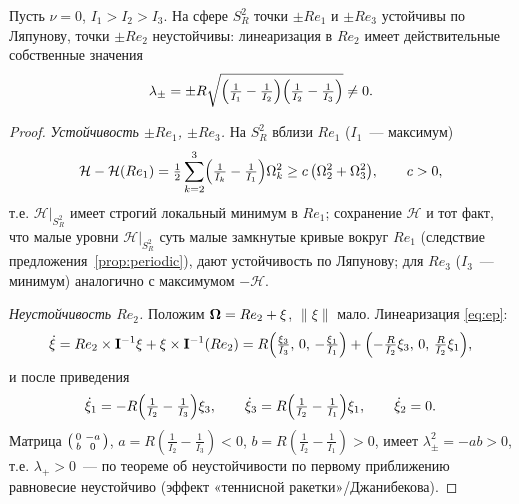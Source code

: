 \begin{proposition}\label{prop:stability}
Пусть $\nu = 0$, $I_1 > I_2 > I_3$. На сфере $S^2_R$ точки $\pm Re_1$
и $\pm Re_3$ устойчивы по Ляпунову, точки $\pm Re_2$ неустойчивы:
линеаризация в $Re_2$ имеет действительные собственные значения
\[
  \lambda_{\pm} = \pm R\sqrt{\Bigl(\tfrac1{I_1}-\tfrac1{I_2}\Bigr)
                           \Bigl(\tfrac1{I_2}-\tfrac1{I_3}\Bigr)} \ne 0 .
\]
\end{proposition}

\begin{proof}
\emph{Устойчивость $\pm Re_1$, $\pm Re_3$.} На $S^2_R$ вблизи $Re_1$
($I_1$~--- максимум)
\[
  \mathcal H - \mathcal H(Re_1)
  = \tfrac12\sum_{k=2}^{3}\Bigl(\tfrac1{I_k}-\tfrac1{I_1}\Bigr)\Omega_k^2
  \ge c\,\bigl(\Omega_2^2+\Omega_3^2\bigr), \qquad c > 0,
\]
т.е. $\mathcal H|_{S^2_R}$ имеет строгий локальный минимум в $Re_1$;
сохранение $\mathcal H$ и тот факт, что малые уровни $\mathcal H|_{S^2_R}$
суть малые замкнутые кривые вокруг $Re_1$ (следствие
предложения~\ref{prop:periodic}), дают устойчивость по Ляпунову;
для $Re_3$ ($I_3$~--- минимум) аналогично с максимумом $-\mathcal H$.

\emph{Неустойчивость $Re_2$.} Положим $\boldsymbol{\Omega} = Re_2 + \xi$,
$\|\xi\|$ мало. Линеаризация \eqref{eq:ep}:
\[
  \dot\xi = Re_2\times\mathbf{I}^{-1}\xi + \xi\times\mathbf{I}^{-1}(Re_2)
  = R\Bigl(\tfrac{\xi_3}{I_3},\,0,\,-\tfrac{\xi_1}{I_1}\Bigr)
    + \Bigl(-\tfrac{R}{I_2}\xi_3,\,0,\,\tfrac{R}{I_2}\xi_1\Bigr),
\]
и после приведения
\[
  \dot\xi_1 = -R\Bigl(\tfrac1{I_2}-\tfrac1{I_3}\Bigr)\xi_3,
  \qquad
  \dot\xi_3 = R\Bigl(\tfrac1{I_2}-\tfrac1{I_1}\Bigr)\xi_1,
  \qquad \dot\xi_2 = 0 .
\]
Матрица $\begin{psmallmatrix}0 & -a\\ b & 0\end{psmallmatrix}$,
$a = R(\tfrac1{I_2}-\tfrac1{I_3}) < 0$,
$b = R(\tfrac1{I_2}-\tfrac1{I_1}) > 0$, имеет
$\lambda_{\pm}^2 = -ab > 0$, т.е. $\lambda_+ > 0$~--- по теореме об
неустойчивости по первому приближению \cite[гл.~VII]{hartman}
равновесие неустойчиво (эффект «теннисной ракетки»/Джанибекова).
\end{proof}
